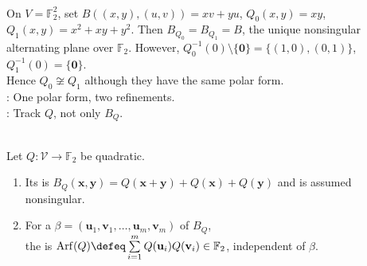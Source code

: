 \begin{example} \label{ex:characteristic-two-quadratic-refinements-finite-field} \\
On $V=\mathbb{F}_2^2$, set $B((x,y),(u,v))=xv+yu$, $Q_0(x,y)=xy$, $Q_1(x,y)=x^2+xy+y^2$. Then $B_{Q_0}=B_{Q_1}=B$, the unique nonsingular alternating plane over $\mathbb{F}_2$. However, $Q_0^{-1}(0)\setminus\{\mathbf{0}\}=\{(1,0),(0,1)\}$, $Q_1^{-1}(0)=\{\mathbf{0}\}$.\\
Hence $Q_0\not\cong Q_1$ although they have the same polar form.\\
: One polar form, two refinements.\\
: Track $Q$, not only $B_Q$.
\end{example}

\begin{definition} \label{def:arf-invariant-over-f2} \\
Let $Q:\mathcal{V}\to\mathbb{F}_2$ be quadratic.
\begin{enumerate}[label=(\roman*)]
\setlength{\itemsep}{0pt}
\item Its  is $B_Q(\mathbf{x},\mathbf{y})=Q(\mathbf{x}+\mathbf{y})+Q(\mathbf{x})+Q(\mathbf{y})$ and is assumed nonsingular.
\item For a  $\beta=(\mathbf{u}_1,\mathbf{v}_1,\ldots,\mathbf{u}_m,\mathbf{v}_m)$ of $B_Q$,\\
the  is $\operatorname{Arf}(Q) \defeq \sum\limits_{i=1}^{m} Q(\mathbf{u}_i)Q(\mathbf{v}_i) \in\mathbb{F}_2$, independent of $\beta$.
\end{enumerate}
\end{definition}

